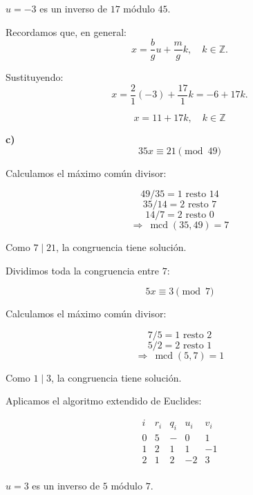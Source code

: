 \documentclass[a4paper,12pt]{article}
\begin{document}
\begin{ejercicio}[title=Ejercicio 32]

$u = -3$ es un inverso de $17$ módulo $45$.

Recordamos que, en general:
\[
x = \frac{b}{g}u + \frac{m}{g}k, \quad k\in\mathbb{Z}.
\]

Sustituyendo:
\[
x = \frac{2}{1}(-3) + \frac{17}{1}k = -6 + 17k.
\]

\[
\boxed{x = 11 + 17k, \quad k \in \mathbb{Z}}
\]

\vspace{1em}

\textbf{c)} \\[0.3em]
\[
35x \equiv 21 \pmod{49}
\]

Calculamos el máximo común divisor:

\[
49 / 35 = 1 \text{ resto } 14
\]
\[
35 / 14 = 2 \text{ resto } \boxed{7}
\]
\[
14 / 7 = 2 \text{ resto } 0
\]
\[
\Rightarrow \ \operatorname{mcd}(35,49) = \boxed{7}
\]

Como $7 \mid 21$, la congruencia tiene solución.

\vspace{0.5em}

Dividimos toda la congruencia entre $7$:

\[
5x \equiv 3 \pmod{7}
\]

Calculamos el máximo común divisor:

\[
7 / 5 = 1 \text{ resto } 2
\]
\[
5 / 2 = 2 \text{ resto } \boxed{1}
\]
\[
\Rightarrow \ \operatorname{mcd}(5,7) = \boxed{1}
\]

Como $1\mid 3$, la congruencia tiene solución.

\vspace{0.5em}

Aplicamos el algoritmo extendido de Euclides:

\[
\begin{array}{c|c|c|c|c}
i & r_i & q_i & u_i & v_i \\ \hline
0 & 5 & - & 0 & 1 \\
1 & 2 & 1 & 1 & -1 \\
2 & \boxed{1} & 2 & -2 & 3 \\
\end{array}
\]

$u = 3$ es un inverso de $5$ módulo $7$.

\end{ejercicio}
\end{document}
